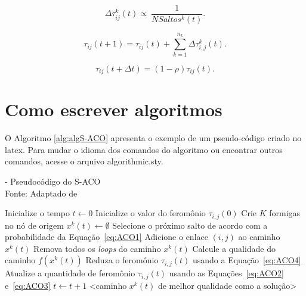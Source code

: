 \begin{equation}\label{eq:ACO2}
\Delta \tau_{ij}^{k}(t) \propto ~\frac{1}{NSaltos^{k}(t)}.
\end{equation}

\begin{equation}\label{eq:ACO3}
\tau _{ij}(t+1) = \tau _{ij}(t)+\sum_{k=1}^{n_{k}}\Delta \tau _{i,j}^{k}(t).
\end{equation}

\begin{equation}\label{eq:ACO4}
\tau _{ij}(t+\Delta{t}) = (1-\rho)\tau_{ij}(t).
\end{equation}

\section{Como escrever algoritmos}\label{s:Algoritmos}

O Algoritmo \ref{alg:algS-ACO} apresenta o exemplo de um pseudo-código criado no latex. Para mudar o idioma dos comandos do algoritmo ou encontrar outros comandos, acesse o arquivo algorithmic.sty.

\begin{algorithm}
\caption{- Pseudocódigo do S-ACO \\ Fonte: Adaptado de }
\label{alg:algS-ACO}
\begin{algorithmic}[1]
\STATE Inicialize o tempo $t \leftarrow 0$
\STATE Inicialize o valor do feromônio $\tau_{i,j}(0)$
\STATE Crie $K$ formigas no nó de origem
\REPEAT
{}
\STATE {}
\STATE $x^{k}(t) \leftarrow \emptyset$
\REPEAT
\STATE Selecione o próximo salto de acordo com a probabilidade da Equação~\ref{eq:ACO1}
\STATE Adicione o enlace $(i,j)$ ao caminho $x^{k}(t)$
\STATE Remova todos os \emph{loops} do caminho $x^{k}(t)$
\STATE Calcule a qualidade do caminho $f(x^{k}(t))$
\ENDFOR
{}
\STATE {}
\STATE Reduza o feromônio $\tau_{i,j}(t)$ usando a Equação~\ref{eq:ACO4}
\ENDFOR
{}
\STATE Atualize a quantidade de feromônio $\tau_{i,j}(t)$ usando as Equações~\ref{eq:ACO2} e~\ref{eq:ACO3}
\ENDFOR
\ENDFOR
\STATE $t \leftarrow t+1$
\RETURN <caminho $x^{k}(t)$ de melhor qualidade como a solução>
\end{algorithmic}
\end{algorithm}